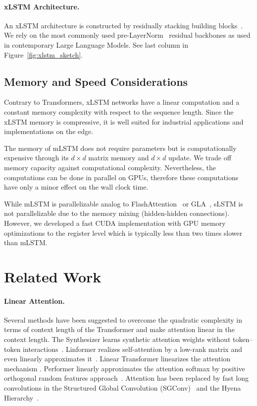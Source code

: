 \paragraph{xLSTM Architecture. }
\label{sec:xLSTMarchitecure}
An xLSTM architecture is constructed by residually stacking building blocks~\citep{Srivastava:15,He:16}. We rely on the most commonly used pre-LayerNorm~\citep{Ba:16b} residual backbones as used in contemporary Large Language Models. See last column in Figure~\ref{fig:xlstm_sketch}. 

\subsection{Memory and Speed Considerations}

Contrary to Transformers, xLSTM networks have a linear computation and a constant memory complexity with respect to the sequence length. Since the xLSTM memory is compressive, it is well suited for industrial applications and implementations on the edge.

The memory of mLSTM does not require parameters but is computationally expensive through its $d \times d$ matrix memory and $d \times d$ update. We trade off memory capacity against computational complexity. Nevertheless, the computations can be done in parallel on GPUs, therefore these computations have only a minor effect on the wall clock time.

While mLSTM is parallelizable analog to FlashAttention~\citep{Dao:22,Dao:23} or GLA~\citep{Yang:23arxiv}, sLSTM is not parallelizable due to the memory mixing (hidden-hidden connections). However, we developed a fast CUDA implementation with GPU memory optimizations to the register level which is typically less than two times slower than mLSTM.

\section{Related Work}
\label{sec:related}

\paragraph{Linear Attention.} Several methods have been suggested to overcome the quadratic complexity in terms of context length of the Transformer and make attention linear in the context length. The Synthesizer learns synthetic attention weights without token--token interactions~\citep{Tay:20arxiv}. Linformer realizes self-attention by a low-rank matrix and even linearly approximates it~\citep{Wang:20arxiv}. Linear Transformer linearizes the attention mechanism \citep{Katharopoulos:20}. Performer linearly approximates the attention softmax by positive orthogonal random features approach~\citep{Choromanski:21}. Attention has been replaced by fast long convolutions in the Structured Global Convolution (SGConv)~\citep{Li:22} and the Hyena Hierarchy~\citep{Poli:23}.


